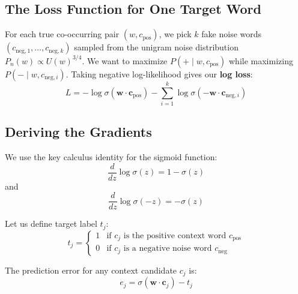 \documentclass[a4paper,11pt]{article}
\newcommand{\vocab}[1]{\textbf{#1}}
\begin{document}
\subsection{The Loss Function for One Target Word}
For each true co-occurring pair $(w, c_{\text{pos}})$, we pick $k$ fake noise words $(c_{\text{neg},1}, \dots, c_{\text{neg},k})$ sampled from the unigram noise distribution $P_n(w) \propto U(w)^{3/4}$.
We want to maximize $P(+ \mid w, c_{\text{pos}})$ while maximizing $P(- \mid w, c_{\text{neg},i})$.
Taking negative log-likelihood gives our \vocab{log loss}:
\begin{equation}
L = - \log \sigma(\mathbf{w} \cdot \mathbf{c}_{\text{pos}}) - \sum_{i=1}^{k} \log \sigma(-\mathbf{w} \cdot \mathbf{c}_{\text{neg},i})
\end{equation}

\subsection{Deriving the Gradients}
We use the key calculus identity for the sigmoid function:
\begin{equation}
\frac{d}{dz} \log \sigma(z) = 1 - \sigma(z)
\end{equation}
and
\begin{equation}
\frac{d}{dz} \log \sigma(-z) = -\sigma(z)
\end{equation}

Let us define target label $t_j$:
\begin{equation}
t_j =
\begin{cases}
1 & \text{if } c_j \text{ is the positive context word } c_{\text{pos}} \\
0 & \text{if } c_j \text{ is a negative noise word } c_{\text{neg}}
\end{cases}
\end{equation}

The prediction error for any context candidate $c_j$ is:
\begin{equation}
e_j = \sigma(\mathbf{w} \cdot \mathbf{c}_j) - t_j
\end{equation}
\end{document}
